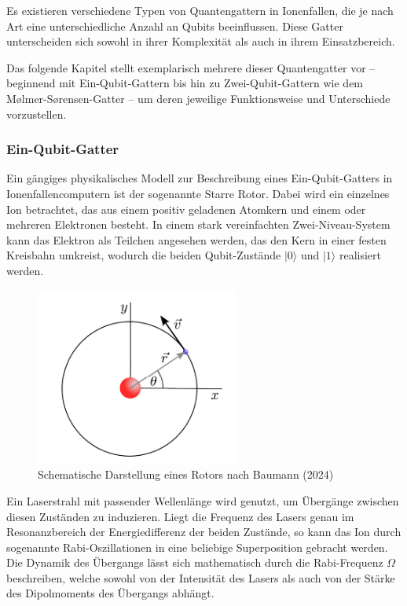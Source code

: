 Es existieren verschiedene Typen von Quantengattern in Ionenfallen, die je nach Art eine unterschiedliche Anzahl an Qubits beeinflussen. Diese Gatter unterscheiden sich sowohl in ihrer Komplexität als auch in ihrem Einsatzbereich.

Das folgende Kapitel stellt exemplarisch mehrere dieser Quantengatter vor – beginnend mit Ein-Qubit-Gattern bis hin zu Zwei-Qubit-Gattern wie dem Mølmer-Sørensen-Gatter – um deren jeweilige Funktionsweise und Unterschiede vorzustellen.

\subsubsection{Ein-Qubit-Gatter}

Ein gängiges physikalisches Modell zur Beschreibung eines Ein-Qubit-Gatters in Ionenfallencomputern ist der sogenannte \glqq Starre Rotor\grqq. Dabei wird ein einzelnes Ion betrachtet, das aus einem positiv geladenen Atomkern und einem oder mehreren Elektronen besteht. In einem stark vereinfachten Zwei-Niveau-System kann das Elektron als Teilchen angesehen werden, das den Kern in einer festen Kreisbahn umkreist, wodurch die beiden Qubit-Zustände \( \lvert 0 \rangle \) und \( \lvert 1 \rangle \) realisiert werden.

\begin{figure}[ht]
    \centering
    \includegraphics[width=0.6\textwidth]{images/quanten-hardware/Rotor.png}
    \caption{Schematische Darstellung eines Rotors nach Baumann (2024)}
    \label{fig:meinbild}
\end{figure}

Ein Laserstrahl mit passender Wellenlänge wird genutzt, um Übergänge zwischen diesen Zuständen zu induzieren. Liegt die Frequenz des Lasers genau im Resonanzbereich der Energiedifferenz der beiden Zustände, so kann das Ion durch sogenannte Rabi-Oszillationen in eine beliebige Superposition gebracht werden. Die Dynamik des Übergangs lässt sich mathematisch durch die Rabi-Frequenz \( \Omega \) beschreiben, welche sowohl von der Intensität des Lasers als auch von der Stärke des Dipolmoments des Übergangs abhängt.

